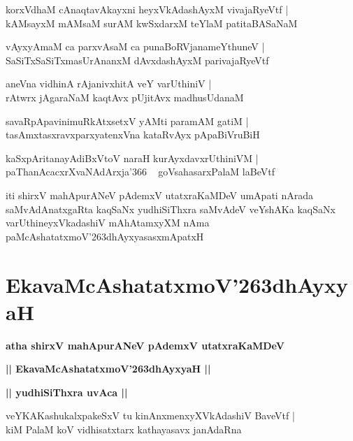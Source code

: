 \documentclass[twoside,12pt,openright]{book}
\def\S{\char'263}
\newcounter{shloka}[chapter]
\def\uvaca#1{\centerline{{\large\textbf{#1}}}}
\begin{document}
\begin{shloka}%
korxVdhaM cAnaqtavAkayxni heyxVkAdashAyxM vivajaRyeVtf |\\
kAMsayxM mAMsaM surAM kwSxdarxM teYlaM patitaBASaNaM 
\end{shloka}

\begin{shloka}%
vAyxyAmaM ca parxvAsaM ca punaBoRVjanameYthuneV |\\
SaSiTxSaSiTxmasUrAnanxM dAvxdashAyxM parivajaRyeVtf 
\end{shloka}

\begin{shloka}%
aneVna vidhinA rAjanivxhitA veY varUthiniV |\\
rAtwrx jAgaraNaM kaqtAvx pUjitAvx madhusUdanaM 
\end{shloka}

\begin{shloka}%
savaRpApavinimuRkAtxsetxV yAMti paramAM gatiM |\\
tasAmxtasxravxparxyatenxVna kataRvAyx pApaBiVruBiH
\end{shloka}

\begin{shloka}%
kaSxpAritanayAdiBxVtoV naraH kurAyxdavxrUthiniVM |\\
paThanAcacxrXvaNAdArxja\char'366 ~ goVsahasarxPalaM laBeVtf
\end{shloka}

\begin{center}
iti shirxV mahApurANeV pAdemxV utatxraKaMDeV umApati nArada saMvAdAnatxgaRta kaqSaNx yudhiSiThxra 
saMvAdeV veYshAKa kaqSaNx varUthineyxVkadashiV mAhAtamxyXM nAma paMcAshatatxmoV\S dhAyxyasasxmApatxH
\end{center}

\chapter{EkavaMcAshatatxmoV\S dhAyxyaH}

\begin{center}
{\LARGE\bfseries atha shirxV mahApurANeV pAdemxV utatxraKaMDeV}
\end{center}

\begin{center}
{\LARGE\bfseries || EkavaMcAshatatxmoV\S dhAyxyaH ||}
\end{center}

\uvaca{|| yudhiSiThxra uvAca ||}

\begin{shloka}%
veYKAKashukalxpakeSxV tu kinAnxmenxyXVkAdashiV BaveVtf |\\
kiM PalaM koV vidhisatxtarx kathayasavx janAdaRna 
\end{shloka}
\end{document}
